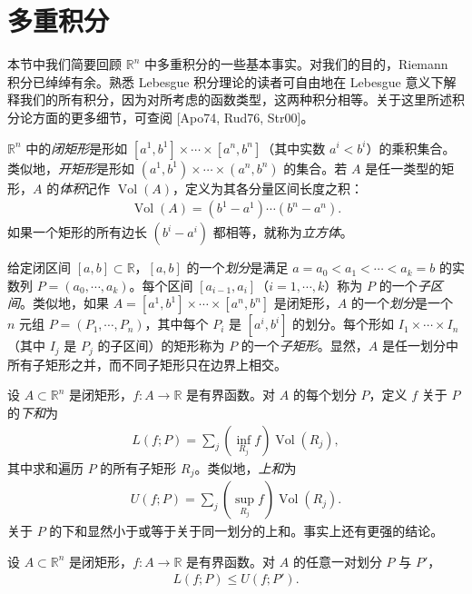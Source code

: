 \documentclass[../../main.tex]{subfiles}
\begin{document}
\section{多重积分}\label{section:appC-multiple-integrals}

本节中我们简要回顾 $\mathbb R^n$ 中多重积分的一些基本事实。对我们的目的，Riemann 积分已绰绰有余。熟悉 Lebesgue 积分理论的读者可自由地在 Lebesgue 意义下解释我们的所有积分，因为对所考虑的函数类型，这两种积分相等。关于这里所述积分论方面的更多细节，可查阅 [Apo74, Rud76, Str00]。

$\mathbb R^n$ 中的\emph{闭矩形}是形如 $[a^1,b^1]\times\cdots\times[a^n,b^n]$（其中实数 $a^i<b^i$）的乘积集合。类似地，\emph{开矩形}是形如 $(a^1,b^1)\times\cdots\times(a^n,b^n)$ 的集合。若 $A$ 是任一类型的矩形，$A$ 的\emph{体积}记作 $\operatorname{Vol}(A)$，定义为其各分量区间长度之积：
\begin{align}\label{align:appC-rectangle-volume}
\operatorname{Vol}(A)=(b^1-a^1)\cdots(b^n-a^n).
\end{align}
如果一个矩形的所有边长 $(b^i-a^i)$ 都相等，就称为\emph{立方体}。

给定闭区间 $[a,b]\subset\mathbb R$，$[a,b]$ 的一个\emph{划分}是满足 $a=a_0<a_1<\cdots<a_k=b$ 的实数列 $P=(a_0,\cdots ,a_k)$。每个区间 $[a_{i-1},a_i]$（$i=1,\cdots ,k$）称为 $P$ 的一个\emph{子区间}。类似地，如果 $A=[a^1,b^1]\times\cdots\times[a^n,b^n]$ 是闭矩形，$A$ 的一个\emph{划分}是一个 $n$ 元组 $P=(P_1,\cdots ,P_n)$，其中每个 $P_i$ 是 $[a^i,b^i]$ 的划分。每个形如 $I_1\times\cdots\times I_n$（其中 $I_j$ 是 $P_j$ 的子区间）的矩形称为 $P$ 的一个\emph{子矩形}。显然，$A$ 是任一划分中所有子矩形之并，而不同子矩形只在边界上相交。

设 $A\subset\mathbb R^n$ 是闭矩形，$f:A\to\mathbb R$ 是有界函数。对 $A$ 的每个划分 $P$，定义 $f$ 关于 $P$ 的\emph{下和}为
\begin{align*}
L(f;P)=\sum_j\left(\inf_{R_j}f\right)\operatorname{Vol}(R_j),
\end{align*}
其中求和遍历 $P$ 的所有子矩形 $R_j$。类似地，\emph{上和}为
\begin{align*}
U(f;P)=\sum_j\left(\sup_{R_j}f\right)\operatorname{Vol}(R_j).
\end{align*}
关于 $P$ 的下和显然小于或等于关于同一划分的上和。事实上还有更强的结论。

\begin{lemma}\label{lemma:appC-upper-lower}
设 $A\subset\mathbb R^n$ 是闭矩形，$f:A\to\mathbb R$ 是有界函数。对 $A$ 的任意一对划分 $P$ 与 $P'$，
\begin{align*}
L(f;P)\leqslant U(f;P').
\end{align*}
\end{lemma}
\end{document}
